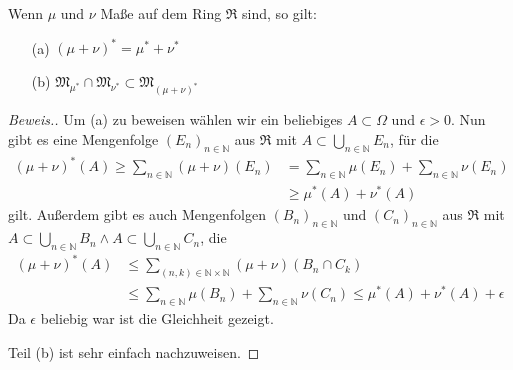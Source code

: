 \begin{lemma}
    Wenn $\mu$ und $\nu$ Maße auf dem Ring $\mathfrak{R}$ sind, so gilt:
    \begin{itemize}
        \item[(a)] $(\mu+\nu)^*=\mu^*+\nu^*$
        \item[(b)] $\mathfrak{M}_{\mu^*}\cap\mathfrak{M}_{\nu^*}\subset\mathfrak{M}_{(\mu+\nu)^*}$ 
    \end{itemize}
\end{lemma}
\begin{proof}[Beweis.]
    Um (a) zu beweisen wählen wir ein beliebiges $A\subset\Omega$ und $\epsilon>0$. Nun gibt es eine Mengenfolge $(E_n)_{n\in\mathbb{N}}$ aus $\mathfrak{R}$ mit $A\subset\bigcup_{n\in\mathbb{N}}E_n$, für die 
    \begin{align*}
        (\mu+\nu)^*(A)\geq\sum_{n\in\mathbb{N}}(\mu+\nu)(E_n)&=\sum_{n\in\mathbb{N}}\mu(E_n)+\sum_{n\in\mathbb{N}}\nu(E_n)\\
        &\geq\mu^*(A)+\nu^*(A)
    \end{align*}
    gilt. Außerdem gibt es auch Mengenfolgen $(B_n)_{n\in\mathbb{N}}$ und $(C_n)_{n\in\mathbb{N}}$ aus $\mathfrak{R}$ mit $A\subset\bigcup_{n\in\mathbb{N}}B_n\land A\subset\bigcup_{n\in\mathbb{N}}C_n$, die 
    \begin{align*}
        (\mu+\nu)^*(A)&\leq\sum_{(n,k)\in\mathbb{N}\times\mathbb{N}}(\mu+\nu)(B_n\cap C_k)\\
        &\leq\sum_{n\in\mathbb{N}}\mu(B_n)+\sum_{n\in\mathbb{N}}\nu(C_n)\leq\mu^*(A)+\nu^*(A)+\epsilon
    \end{align*}
    Da $\epsilon$ beliebig war ist die Gleichheit gezeigt.

    Teil (b) ist sehr einfach nachzuweisen.
\end{proof}